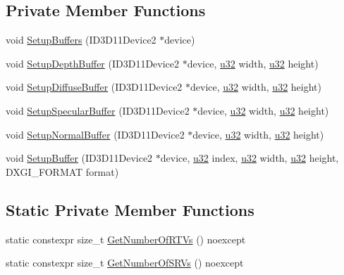 \subsection*{Private Member Functions}
\begin{DoxyCompactItemize}
\item 
void \hyperlink{structmage_1_1_g_buffer_a5b0d4c4b0e29afad8524d11f66a5ff3d}{Setup\+Buffers} (I\+D3\+D11\+Device2 $\ast$device)
\item 
void \hyperlink{structmage_1_1_g_buffer_acae80f295e232a9ce10554516b0e337e}{Setup\+Depth\+Buffer} (I\+D3\+D11\+Device2 $\ast$device, \hyperlink{namespacemage_af2b398bf98eb10351f49cad73fe2cc73}{u32} width, \hyperlink{namespacemage_af2b398bf98eb10351f49cad73fe2cc73}{u32} height)
\item 
void \hyperlink{structmage_1_1_g_buffer_a80672c9a8faebe7c00e26040e19d03b8}{Setup\+Diffuse\+Buffer} (I\+D3\+D11\+Device2 $\ast$device, \hyperlink{namespacemage_af2b398bf98eb10351f49cad73fe2cc73}{u32} width, \hyperlink{namespacemage_af2b398bf98eb10351f49cad73fe2cc73}{u32} height)
\item 
void \hyperlink{structmage_1_1_g_buffer_a6681f3e4cd4eef5d813b1ba69ca90bd5}{Setup\+Specular\+Buffer} (I\+D3\+D11\+Device2 $\ast$device, \hyperlink{namespacemage_af2b398bf98eb10351f49cad73fe2cc73}{u32} width, \hyperlink{namespacemage_af2b398bf98eb10351f49cad73fe2cc73}{u32} height)
\item 
void \hyperlink{structmage_1_1_g_buffer_a04f953ae48d8732d5dd6df24daf70f5a}{Setup\+Normal\+Buffer} (I\+D3\+D11\+Device2 $\ast$device, \hyperlink{namespacemage_af2b398bf98eb10351f49cad73fe2cc73}{u32} width, \hyperlink{namespacemage_af2b398bf98eb10351f49cad73fe2cc73}{u32} height)
\item 
void \hyperlink{structmage_1_1_g_buffer_aef2fe4c61bb16328228694e69e9a4d9b}{Setup\+Buffer} (I\+D3\+D11\+Device2 $\ast$device, \hyperlink{namespacemage_af2b398bf98eb10351f49cad73fe2cc73}{u32} index, \hyperlink{namespacemage_af2b398bf98eb10351f49cad73fe2cc73}{u32} width, \hyperlink{namespacemage_af2b398bf98eb10351f49cad73fe2cc73}{u32} height, D\+X\+G\+I\+\_\+\+F\+O\+R\+M\+AT format)
\end{DoxyCompactItemize}
\subsection*{Static Private Member Functions}
\begin{DoxyCompactItemize}
\item 
static constexpr size\+\_\+t \hyperlink{structmage_1_1_g_buffer_a732cac527995dda5a9b19991fd23e0cf}{Get\+Number\+Of\+R\+T\+Vs} () noexcept
\item 
static constexpr size\+\_\+t \hyperlink{structmage_1_1_g_buffer_ae7966e3c50ecf69c153e05b01da7456e}{Get\+Number\+Of\+S\+R\+Vs} () noexcept
\end{DoxyCompactItemize}
